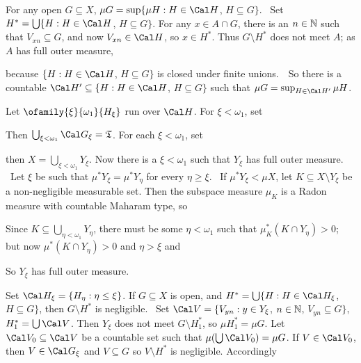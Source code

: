 {For any open $G\subseteq X$,
$\mu G=\sup\{\mu H:H\in\Cal H$, $H\subseteq G\}$.   \Prf\ Set
$H^*=\bigcup\{H:H\in\Cal H$, $H\subseteq G\}$.   For any $x\in A\cap G$,
there is an $n\in\Bbb N$ such that $V_{xn}\subseteq G$, and now
$V_{xn}\in\Cal H$, so $x\in H^*$.   Thus $G\setminus H^*$ does not meet
$A$;  as $A$ has full outer measure,


\noindent because $\{H:H\in\Cal H$, $H\subseteq G\}$ is closed under
finite unions.\ \QeD\  So there is a countable
$\Cal H'\subseteq\{H:H\in\Cal H$, $H\subseteq G\}$ such that
$\mu G=\sup_{H\in\Cal H'}\mu H$.

Let $\ofamily{\xi}{\omega_1}{H_{\xi}}$ run over $\Cal H$.   For
$\xi<\omega_1$, set


\noindent Then $\bigcup_{\xi<\omega_1}\Cal G_{\xi}=\frak T$.   For each
$\xi<\omega_1$, set


\noindent then $X=\bigcup_{\xi<\omega_1}Y_{\xi}$.   Now there is a
$\xi<\omega_1$ such that $Y_{\xi}$ has full outer measure.   \Prf\ Let
$\xi$ be such that $\mu^*Y_{\xi}=\mu^*Y_{\eta}$ for every $\eta\ge\xi$.
\Quer\ If $\mu^*Y_{\xi}<\mu X$, let $K\subseteq X\setminus Y_{\xi}$ be a
non-negligible measurable set.   Then the subspace measure $\mu_K$ is a
Radon measure with countable Maharam type, so


\noindent Since $K\subseteq\bigcup_{\eta<\omega_1}Y_{\eta}$, there must
be some $\eta<\omega_1$ such that $\mu^*_K(K\cap Y_{\eta})>0$;   but now
$\mu^*(K\cap Y_{\eta})>0$ and $\eta>\xi$ and


\noindent So $Y_{\xi}$ has full outer measure.\ \Qed

Set $\Cal H_{\xi}=\{H_{\eta}:\eta\le\xi\}$.   If $G\subseteq X$ is open,
and $H^*=\bigcup\{H:H\in\Cal H_{\xi}$, $H\subseteq G\}$, then
$G\setminus H^*$ is negligible.   \Prf\ Set
$\Cal V=\{V_{yn}:y\in Y_{\xi}$, $n\in\Bbb N$, $V_{yn}\subseteq G\}$,
$H_1^*=\bigcup\Cal V$.   Then $Y_{\xi}$ does not meet
$G\setminus H_1^*$, so $\mu H_1^*=\mu G$.   Let
$\Cal V_0\subseteq\Cal V$ be a countable set such that
$\mu(\bigcup\Cal V_0)=\mu G$.   If $V\in\Cal V_0$, then
$V\in\Cal G_{\xi}$ and $V\subseteq G$ so $V\setminus H^*$ is negligible.
Accordingly

}
